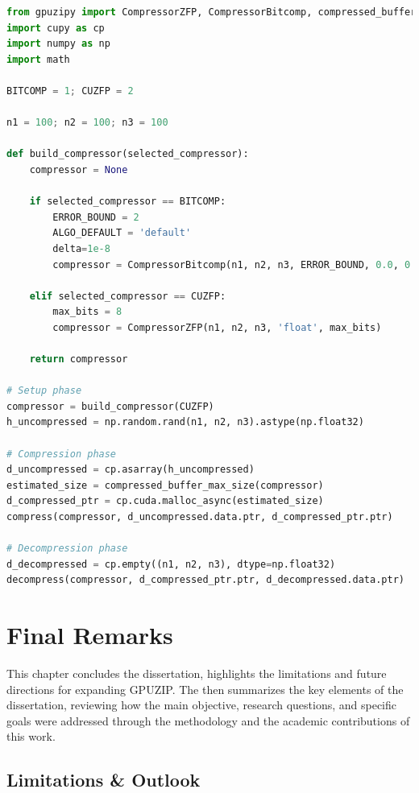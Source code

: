 \documentclass[Ingles,Final]{ic-tese-v3}
\begin{document}
\begin{minipage}{\linewidth}
\begin{lstlisting}[language=Python, caption={Example of using GPUZIPY to compress data on the GPU}, label={lst:gpuzipy}]
from gpuzipy import CompressorZFP, CompressorBitcomp, compressed_buffer_size, compressed_buffer_max_size, compress, decompress
import cupy as cp
import numpy as np
import math

BITCOMP = 1; CUZFP = 2

n1 = 100; n2 = 100; n3 = 100

def build_compressor(selected_compressor):
    compressor = None

    if selected_compressor == BITCOMP: 
        ERROR_BOUND = 2
        ALGO_DEFAULT = 'default'
        delta=1e-8
        compressor = CompressorBitcomp(n1, n2, n3, ERROR_BOUND, 0.0, 0.0, delta, 'float', ALGO_DEFAULT)
    
    elif selected_compressor == CUZFP:
        max_bits = 8
        compressor = CompressorZFP(n1, n2, n3, 'float', max_bits)

    return compressor

# Setup phase
compressor = build_compressor(CUZFP)
h_uncompressed = np.random.rand(n1, n2, n3).astype(np.float32)

# Compression phase
d_uncompressed = cp.asarray(h_uncompressed)
estimated_size = compressed_buffer_max_size(compressor)
d_compressed_ptr = cp.cuda.malloc_async(estimated_size)
compress(compressor, d_uncompressed.data.ptr, d_compressed_ptr.ptr)

# Decompression phase
d_decompressed = cp.empty((n1, n2, n3), dtype=np.float32)
decompress(compressor, d_compressed_ptr.ptr, d_decompressed.data.ptr)
\end{lstlisting}
\end{minipage}

\chapter{Final Remarks}
\label{ch:conclusion}
This chapter concludes the dissertation,  highlights the limitations and future directions for expanding GPUZIP. The  then summarizes the key elements of the dissertation, reviewing how the main objective, research questions, and specific goals were addressed through the methodology and the academic contributions of this work.

\section{Limitations \& Outlook}
\label{sec:limitations}
\end{document}
